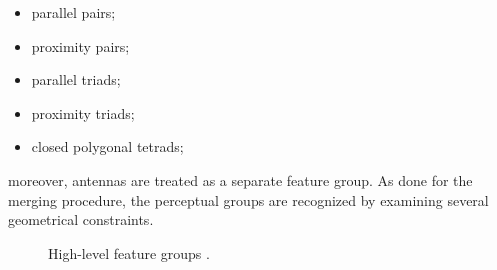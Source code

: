\begin{itemize}
  \item parallel pairs;
  \item proximity pairs;
  \item parallel triads;
  \item proximity triads;
  \item closed polygonal tetrads;
\end{itemize}

moreover, antennas are treated as a separate feature group.
As done for the merging procedure, the perceptual groups are recognized by examining several geometrical constraints.

\begin{figure}[htbp]
  \centering
  \qquad
  \qquad
  \qquad
  \qquad
  \qquad
  \caption{High-level feature groups \cite{Sharma2018}.}
  \label{fig:highLevelGroups}
\end{figure}

